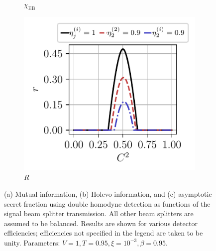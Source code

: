 \documentclass[%
reprint,
superscriptaddress,
 amsmath,amssymb,amsfonts,
 aps,
 pra,
 longbibliography
]{revtex4-2}
\newcommand{\ind}[1]{\mathrm{#1}}
\begin{document}
\begin{figure}
\begin{subfigure}[c]{.3\linewidth}
\caption[]{$\chi_{\ind{EB}}$}
\end{subfigure}
\hfill
    \begin{subfigure}[c]{.3\linewidth}
\includegraphics[width=\linewidth, trim={.2cm .3cm .4cm .35cm},clip]{pics/qkd/dhom/r.pdf}
\caption[]{$R$}
        \end{subfigure}
        \caption{(a) Mutual information, (b) Holevo information, and (c) asymptotic secret fraction using double homodyne detection as functions of the signal beam splitter transmission. All other beam splitters are assumed to be balanced. Results are shown for various detector efficiencies; efficiencies not specified in the legend are taken to be unity. Parameters: $V=1, T=0.95, \xi=10^{-3}, \beta=0.95$.
}
\label{fig:double-homodyne-all}
\end{figure}
\end{document}
